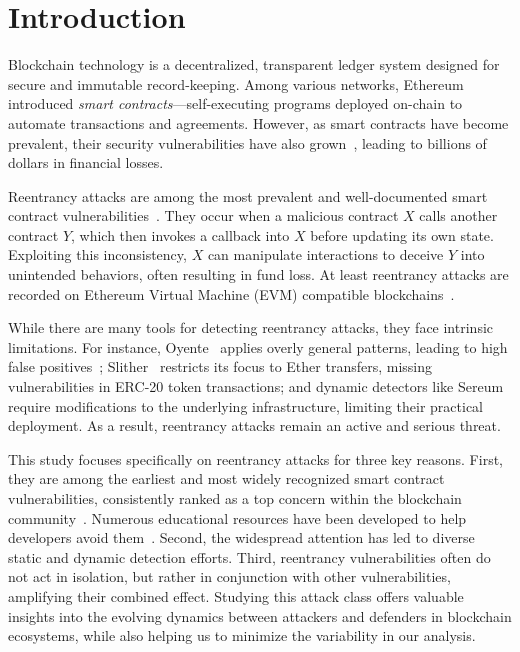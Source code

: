 \section{Introduction}

Blockchain technology is a decentralized, transparent ledger system designed for secure and immutable record-keeping. Among various networks, Ethereum~\cite{ethereum-whitepaper} introduced \textit{smart contracts}—self-executing programs deployed on-chain to automate transactions and agreements. However, as smart contracts have become prevalent, their security vulnerabilities have also grown~\cite{top-smart-contract-attacks, top-smart-contract-attacks-2025}, leading to billions of dollars in financial losses.

Reentrancy attacks are among the most prevalent and well-documented smart contract vulnerabilities~\cite{top-smart-contract-attacks}. They occur when a malicious contract \(X\) calls another contract \(Y\), which then invokes a callback into \(X\) before updating its own state. Exploiting this inconsistency, \(X\) can manipulate interactions to deceive \(Y\) into unintended behaviors, often resulting in fund loss. At least \ReentrancyTotalNumber{} reentrancy attacks are recorded on Ethereum Virtual Machine (EVM) compatible blockchains~\cite{reentrancy-list-pcaversaccio,blocksec-security-incidents,slowmist-hacked}.

While there are many tools for detecting reentrancy attacks, they face intrinsic limitations. For instance, Oyente~\cite{oyente} applies overly general patterns, leading to high false positives~\cite{survey:static-analysis}; Slither~\cite{slither} restricts its focus to Ether transfers, missing vulnerabilities in ERC-20 token transactions; and dynamic detectors like Sereum~\cite{sereum} require modifications to the underlying infrastructure, limiting their practical deployment. As a result, reentrancy attacks remain an active and serious threat.

This study focuses specifically on reentrancy attacks for three key reasons. First, they are among the earliest and most widely recognized smart contract vulnerabilities, consistently ranked as a top concern within the blockchain community~\cite{top-smart-contract-attacks}. Numerous educational resources have been developed to help developers avoid them~\cite{solidity-security-considerations,checks-effects-interactions}. Second, the widespread attention has led to diverse static and dynamic detection efforts. Third, reentrancy vulnerabilities often do not act in isolation, but rather in conjunction with other vulnerabilities, amplifying their combined effect. Studying this attack class offers valuable insights into the evolving dynamics between attackers and defenders in blockchain ecosystems, while also helping us to minimize the variability in our analysis.

